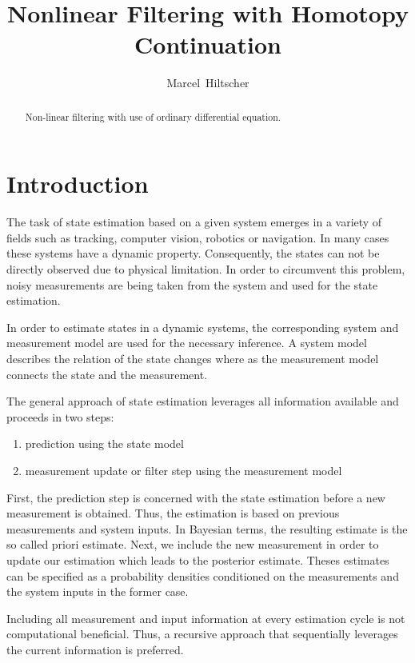 \documentclass[a4paper]{IEEEtran}
\title{Nonlinear Filtering with Homotopy Continuation}
\author{Marcel~Hiltscher}
\begin{document}
\maketitle

\begin{abstract}
Non-linear filtering with use of ordinary differential equation.
\end{abstract}

\section{Introduction}
\label{ch:intro}

The task of state estimation based on a given system emerges in a variety of fields such as tracking, computer vision, robotics or navigation.
In many cases these systems have a dynamic property. Consequently, the states can not be directly observed due to physical limitation. In order to 
circumvent this problem, noisy measurements are being taken from the system and used for the state estimation. 

In order to estimate states in a dynamic systems, the corresponding system and measurement model are used for the necessary inference. A system model describes the relation of the state changes where as the measurement
model connects the state and the measurement.

The general approach of state estimation leverages all information available and proceeds in two steps:
\begin{enumerate}
    \item prediction using the state model
    \item measurement update or filter step using the measurement model
\end{enumerate}

First, the prediction step is concerned with the state estimation before a new measurement is obtained. Thus, the estimation is based on previous measurements and system inputs.
In Bayesian terms, the resulting estimate is the so called priori estimate. Next, we include the new measurement in order to update our estimation which leads to the posterior estimate. 
Theses estimates can be specified as a probability densities conditioned on the measurements and the system inputs in the former case.

Including all measurement and input information at every estimation cycle is not computational beneficial. Thus, a recursive approach that sequentially leverages the current information is preferred.
\end{document}
